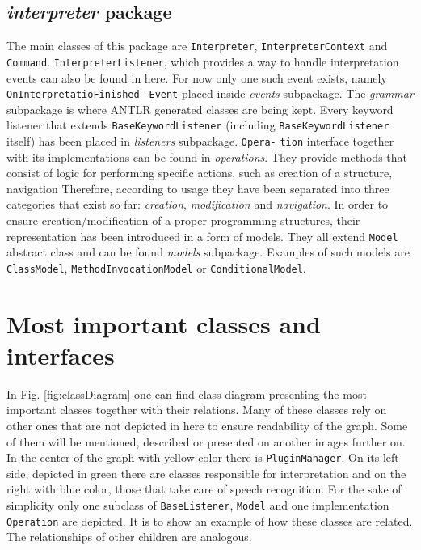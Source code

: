 \subsection{\textit{interpreter} package}
The main classes of this package are \texttt{Interpreter}, \texttt{InterpreterContext} and \texttt{Command}. \texttt{InterpreterListener}, which provides a way to handle interpretation events can also be found in here. For now only one such event exists, namely \texttt{OnInterpretatioFinished-} \texttt{Event} placed inside \textit{events} subpackage. The \textit{grammar} subpackage is where ANTLR generated classes are being kept. Every keyword listener that extends \texttt{BaseKeywordListener} (including \texttt{BaseKeywordListener} itself) has been placed in \textit{listeners} subpackage. \texttt{Opera-} \texttt{tion} interface together with its implementations can be found in \textit{operations}. They provide methods that consist of logic for performing specific actions, such as creation of a structure, navigation \etc Therefore, according to usage they have been separated into three categories that exist so far: \textit{creation}, \textit{modification} and \textit{navigation}. In order to ensure creation/modification of a proper programming structures, their representation has been introduced in a form of models. They all extend \texttt{Model} abstract class and can be found \textit{models} subpackage. Examples of such models are \eg \texttt{ClassModel}, \texttt{MethodInvocationModel} or \texttt{ConditionalModel}.


\section{Most important classes and interfaces}

In Fig. \ref{fig:classDiagram} one can find class diagram presenting the most important classes together with their relations. Many of these classes rely on other ones that are not depicted in here to ensure readability of the graph. Some of them will be mentioned, described or presented on another images further on. In the center of the graph with yellow color there is \texttt{PluginManager}. On its left side, depicted in green there are classes responsible for interpretation and on the right with blue color, those that take care of speech recognition. For the sake of simplicity only one subclass of \texttt{BaseListener}, \texttt{Model} and one implementation \texttt{Operation} are depicted. It is to show an example of how these classes are related. The relationships of other children are analogous.

